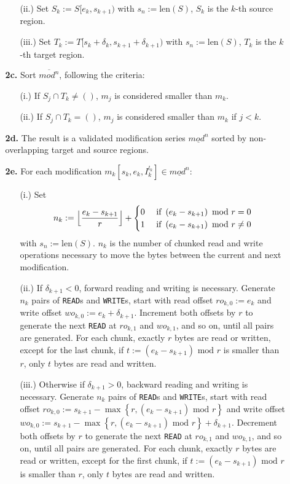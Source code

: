 \documentclass[english, 10pt, openright, twocolumn, landscape, twoside, notitlepage, a4paper, pdftex]		
{article}
\begin{document}
\begin{itemize}
\begin{enumerate}
\begin{enumerate}
\item [(ii.)] Set $S_{k}:=S[e_{k},s_{k+1})$ with $s_{n}:=\text{len}(S)$, $S_{k}$ is the $k$-th source region.
\item [(iii.)] Set $T_{k}:=T[s_{k}+\delta_{k},s_{k+1}+\delta_{k+1})$ with $s_{n}:=\text{len}(S)$, $T_{k}$ is the $k$-th target region.
\end{enumerate}
\item [\textbf{2c.}] Sort $\overline{mod^{n}}$, following the criteria:
\begin{enumerate}
\item[(i.)] If $S_{j}\cap T_{k}\neq ()$, $m_{j}$ is considered smaller than $m_{k}$.
\item[(ii.)] If $S_{j}\cap T_{k}=()$, $m_{j}$ is considered smaller than $m_{k}$ if $j<k$.
\end{enumerate}
\item [\textbf{2d.}] The result is a validated modification series $\underline{mod^{n}}$ sorted by non-overlapping target and source regions.
\item [\textbf{2e.}] For each modification $m_{k}[s_{k}, e_{k}, I_{k}^{l_{k}}]\in\underline{mod^{n}}$:
\begin{enumerate}
\item [(i.)] Set 
\[n_{k}:=\Bigl\lfloor\frac{e_{k}-s_{k+1}}{r}\Bigr\rfloor+
\begin{cases}
0 & \text{ if }\left(e_{k}-s_{k+1}\right)\text{ mod } r = 0\\
1 & \text{ if }\left(e_{k}-s_{k+1}\right)\text{ mod } r \neq 0\\
\end{cases}\]
 with $s_{n}:=\text{len}(S)$. $n_{k}$ is the number of chunked read and write operations necessary to move the bytes between the current and next modification.
\item [(ii.)] If $\delta_{k+1}<0$, forward reading and writing is necessary. Generate $n_{k}$ pairs of \texttt{READ}s and \texttt{WRITE}s, start with read offset $ro_{k,0}:=e_{k}$ and write offset $wo_{k,0}:=e_{k}+\delta_{k+1}$. Increment both offsets by $r$ to generate the next \texttt{READ} at $ro_{k,1}$ and $wo_{k,1}$, and so on, until all pairs are generated. For each chunk, exactly $r$ bytes are read or written, except for the last chunk, if $t:=\left(e_{k}-s_{k+1}\right)\text{ mod } r$ is smaller than $r$, only $t$ bytes are read and written.
\item [(iii.)] Otherwise if $\delta_{k+1}>0$, backward reading and writing is necessary. Generate $n_{k}$ pairs of \texttt{READ}s and \texttt{WRITE}s, start with read offset $ro_{k,0}:=s_{k+1}-\max\left\{r, \left(e_{k}-s_{k+1}\right)\text{ mod } r\right\}$ and write offset $wo_{k,0}:=s_{k+1}-\max\left\{r, \left(e_{k}-s_{k+1}\right)\text{ mod } r\right\}+\delta_{k+1}$. Decrement both offsets by $r$ to generate the next \texttt{READ} at $ro_{k,1}$ and $wo_{k,1}$, and so on, until all pairs are generated. For each chunk, exactly $r$ bytes are read or written, except for the first chunk, if $t:=\left(e_{k}-s_{k+1}\right)\text{ mod } r$ is smaller than $r$, only $t$ bytes are read and written.

\end{enumerate}
\end{enumerate}
\end{itemize}
\end{document}

